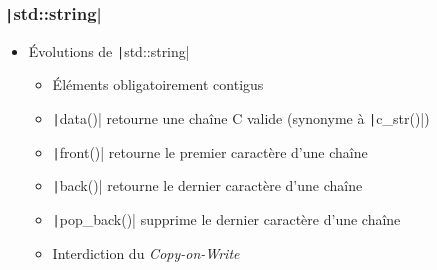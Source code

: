 \documentclass[C++.tex]{subfiles}
\begin{document}
\begin{frame}[fragile]
	\frametitle{\texttt|std::string|}
	\begin{itemize}
		\item Évolutions de \texttt|std::string|
		\begin{itemize}
			\item Éléments obligatoirement contigus
			\item \texttt|data()| retourne une chaîne C valide (synonyme à \texttt|c_str()|)


			\item \texttt|front()| retourne le premier caractère d'une chaîne
			\item \texttt|back()| retourne le dernier caractère d'une chaîne
			\item \texttt|pop_back()| supprime le dernier caractère d'une chaîne
			\item Interdiction du \textit{Copy-on-Write}
		\end{itemize}
	\end{itemize}
\end{frame}
\end{document}
